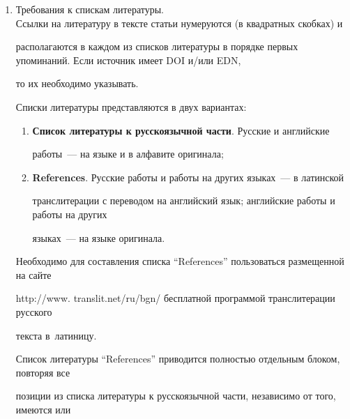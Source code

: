 {\begin{enumerate}[1.]
\item  Требования к спискам литературы.\\[-14pt]





Ссылки на литературу в тексте статьи нумеруются (в квадратных скобках) и


располагаются в каждом из списков литературы в порядке  первых упоминаний. Если источник имеет DOI и/или EDN,


то их необходимо указывать.





Списки литературы представляются в двух вариантах:\\[-14pt]








\noindent


\begin{enumerate}[(1)]


\item \textbf{Список литературы к русскоязычной части}. Русские и английские


работы~---  на языке и в алфавите оригинала;\\[-14.5pt]


\item  \textbf{References}. Русские работы и работы на других языках~--- в латинской


транслитерации с переводом на английский язык; английские работы и работы на других


языках~--- на языке оригинала.


\end{enumerate}





Необходимо для составления списка ``References'' пользоваться размещенной на сайте


{\sf http://www. translit.net/ru/bgn/} бесплатной программой транслитерации русского


 текста в~латиницу. %





Список литературы ``References'' приводится полностью отдельным блоком, повторяя все


позиции из списка литературы к русскоязычной части, независимо от того, имеются или



\end{enumerate}}
